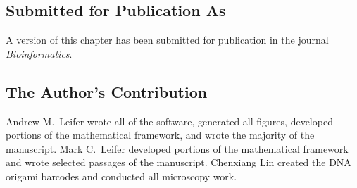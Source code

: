 \subsection{Submitted for Publication As}
A version of this chapter has been submitted for publication in the journal \textit{Bioinformatics}.

\subsection{The Author's Contribution}
Andrew M.~Leifer wrote all of the software, generated all figures, developed portions of the mathematical framework, and wrote the majority of the manuscript. Mark C.~Leifer developed portions of the mathematical framework and wrote selected passages of the manuscript. Chenxiang Lin created the DNA origami barcodes and conducted all microscopy work. 
 
